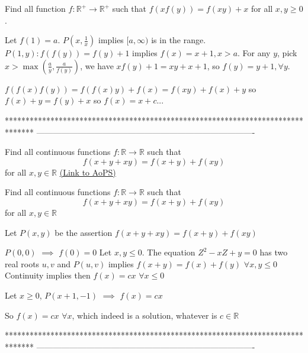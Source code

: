 \begin{solution}
	\begin{tcolorbox}Find all function $f: \mathbb{R^+}\to\mathbb{R^+}$ such that $f(xf(y))=f(xy)+x$ for all $x,y{\ge}0$.\end{tcolorbox}

Let $f(1)=a$. 
$P(x,\frac1x)$ implies $[a,\infty)$ is in the range.
$P(1,y):f(f(y))=f(y)+1$ implies $f(x)=x+1,x>a$.
For any $y$, pick $x>\max(\frac ay,\frac a{f(y)})$, we have
$xf(y)+1=xy+x+1$, so $f(y)=y+1,\forall y$.
\end{solution}



\begin{solution}
	$ f(f(x)f(y))=f(f(x)y)+f(x)=f(xy)+f(x)+y $ so $f(x)+y=f(y)+x$ so $f(x)=x+c...$
\end{solution}
*******************************************************************************
-------------------------------------------------------------------------------

\begin{problem}
	Find all continuous functions $f:\mathbb{R} \rightarrow \mathbb{R}$ such that
\[f(x+y+xy)=f(x+y)+f(xy)\] for all $x,y \in \mathbb{R}$
	\flushright \href{https://artofproblemsolving.com/community/c6h608705}{(Link to AoPS)}
\end{problem}



\begin{solution}
	\begin{tcolorbox}Find all continuous functions $f:\mathbb{R} \rightarrow \mathbb{R}$ such that
\[f(x+y+xy)=f(x+y)+f(xy)\] for all $x,y \in \mathbb{R}$\end{tcolorbox}
Let $P(x,y)$ be the assertion $f(x+y+xy)=f(x+y)+f(xy)$

$P(0,0)$ $\implies$ $f(0)=0$
Let $x,y\le 0$. The equation $Z^2-xZ+y=0$ has two real roots $u,v$ and $P(u,v)$ implies $f(x+y)=f(x)+f(y)$ $\forall x,y\le 0$
Continuity implies then $f(x)=cx$ $\forall x\le 0$

Let $x\ge 0$, $P(x+1,-1)$ $\implies$ $f(x)=cx$ 

So $\boxed{f(x)=cx}$ $\forall x$, which indeed is a solution, whatever is $c\in\mathbb R$
\end{solution}
*******************************************************************************
-------------------------------------------------------------------------------

